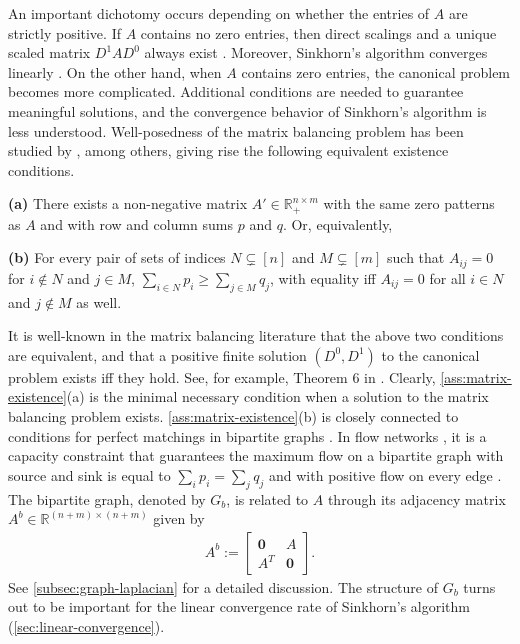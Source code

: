 An important dichotomy occurs depending on whether the entries of $A$ are strictly positive. If $A$ contains no zero entries, then direct scalings and a unique scaled matrix $D^1AD^0$ always exist \citep{sinkhorn1964relationship}. Moreover, Sinkhorn's algorithm converges linearly \citep{franklin1989scaling}. 
On the other hand, when $A$ contains zero entries, the canonical problem becomes more complicated. Additional conditions are needed to guarantee meaningful solutions, and the convergence behavior of Sinkhorn's algorithm is less understood.  Well-posedness of the matrix balancing problem has been studied by \citet{brualdi1968convex,sinkhorn1974diagonal,pukelsheim2009iterative}, among others, giving rise the following equivalent existence conditions.
\begin{assumption}
\label{ass:matrix-existence}
\textbf{(a)} There exists a non-negative matrix $A'\in \mathbb{R}_+^{n\times m}$ with the same zero patterns as $A$ and with row and column sums $p$ and $q$. Or, equivalently,

\textbf{(b)} For every pair of sets of indices $N \subsetneq [n]$ and $M \subsetneq [m]$ such that $A_{ij}=0$ for $i\notin N$ and $j\in M$, $\sum_{i\in N}p_i \geq \sum_{j\in M}q_j$, with equality iff $A_{ij}=0$ for all $i \in N$ and $j \notin M$ as well.
\end{assumption} 
It is well-known in the matrix balancing literature that the above two conditions are equivalent, and that a positive finite solution $(D^{0},D^{1})$ to the canonical problem exists iff they hold. See, for example, Theorem 6 in \citet{pukelsheim2009iterative}. Clearly, \cref{ass:matrix-existence}(a) is the minimal necessary condition when a solution to the matrix balancing problem exists. \cref{ass:matrix-existence}(b) is closely connected to conditions for perfect matchings in bipartite graphs \citep{hall1935representatives}. In flow networks \citep{gale1957theorem,ford1956maximal,ford1957simple}, it is a capacity constraint that
guarantees the maximum flow on a bipartite graph with source and sink is equal to $\sum_i p_i=\sum_j q_j$ and with positive flow on every edge \citep{idel2016review}.  The bipartite graph, denoted by $G_b$, is related to $A$ through its  adjacency matrix $A^b \in \mathbb{R}^{(n+m)\times(n+m)}$ given by
\begin{align*}
    A^b := \begin{bmatrix}\mathbf{0} & {A}\\
{A}^{T} & \mathbf{0}
\end{bmatrix}.	
\end{align*}
See \cref{subsec:graph-laplacian} for a detailed discussion. The structure of $G_b$ turns out to be important for the linear convergence rate of Sinkhorn's algorithm (\cref{sec:linear-convergence}).

